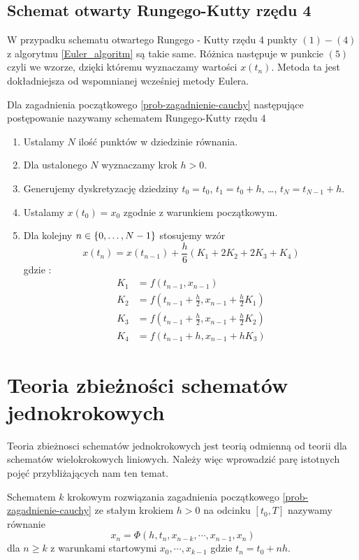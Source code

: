 \documentclass[12pt,a4paper]{report}
\begin{document}
\subsection{Schemat otwarty Rungego-Kutty rzędu 4}
W przypadku schematu otwartego Rungego - Kutty rzędu 4 punkty $ (1) - (4) $ z algorytmu \ref{Euler_algoritm} są takie same. Różnica następuje w punkcie $(5)$ czyli we wzorze, dzięki któremu wyznaczamy wartości $x(t_n)$. Metoda ta jest dokładniejsza od wspomnianej wcześniej metody Eulera.
\begin{algorithm}
Dla zagadnienia początkowego \ref{prob-zagadnienie-cauchy} następujące postępowanie nazywamy schematem Rungego-Kutty rzędu 4 
\begin{enumerate}
\item Ustalamy $N$ ilość punktów w dziedzinie równania. 
\item Dla ustalonego $N$ wyznaczamy krok $h>0$. 
\item Generujemy dyskretyzację dziedziny $t_0 = t_0$, $t_1 = t_0 + h$, \ldots, $t_N = t_{N-1}+h$. 
\item Ustalamy $x(t_0) = x_0$ zgodnie z warunkiem początkowym.
\item Dla kolejny $n \in \left\lbrace {0, \ldots, N-1} \right\rbrace$ stosujemy wzór
$$
x(t_{n}) = x(t_{n-1}) + \frac{h}{6} ( K_1 + 2K_2 + 2K_3 + K_4 )
$$
gdzie :
$$
\begin{array}{cl}
K_1 &= f(t_{n-1},x_{n-1}) \\
K_2 &= f(t_{n-1} + \frac{h}{2}, x_{n-1} + \frac{h}{2} K_1) \\
K_3 &= f(t_{n-1} + \frac{h}{2}, x_{n-1} + \frac{h}{2} K_2) \\
K_4 &= f(t_{n-1} + h, x_{n-1} + hK_3) 
\end{array}
$$
\end{enumerate}

\end{algorithm}
\section{Teoria zbieżności schematów jednokrokowych}
Teoria zbieżnosci schematów jednokrokowych jest teorią odmienną od teorii dla schematów wielokrokowych liniowych. Należy więc wprowadzić parę istotnych pojęć przybliżających nam ten temat. 

\begin{definition} 
Schematem $k$ krokowym rozwiązania zagadnienia początkowego \ref{prob-zagadnienie-cauchy} ze stałym krokiem $h>0$ na odcinku $[t_0,T]$ nazywamy równanie
$$
x_n = \Phi (h,t_n,x_{n-k},\cdots,x_{n-1},x_n) \label{k-steps-scheme}
$$
dla $ n \geq k$ z warunkami startowymi $x_0,\cdots, x_{k-1}$ gdzie $t_n = t_0 + nh$.
\end{definition}
\end{document}
